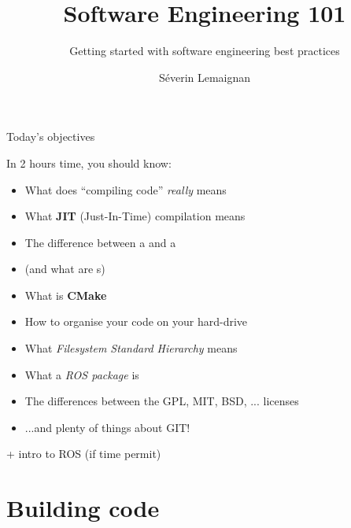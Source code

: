 \documentclass[compress]{beamer}
\title{Software Engineering 101}
\subtitle{Getting started with software engineering best practices}
\date{}
\author{Séverin Lemaignan}
\institute{Bristol Robotics Lab\\{\bf University of West of England}}
\makeatletter
\let\beamer@writeslidentry@miniframeson=\beamer@writeslidentry
\def\beamer@writeslidentry@miniframesoff{%
  \expandafter\beamer@ifempty\expandafter{\beamer@framestartpage}{}%
  {%
    \clearpage\beamer@notesactions%
  }
}
\newcommand*{\miniframeson}{\let\beamer@writeslidentry=\beamer@writeslidentry@miniframeson}
\newcommand*{\miniframesoff}{\let\beamer@writeslidentry=\beamer@writeslidentry@miniframesoff}
\makeatother
\begin{document}

\maketitle

\miniframesoff

\begin{frame}{Today's objectives}

    In 2 hours time, you should know:

    \begin{itemize}
        \item What does ``compiling code'' \emph{really} means
        \item What \textbf{JIT} (Just-In-Time) compilation means
        \item The difference between a  and a 
        \item (and what are s)
        \item What is {\bf CMake}
        \item How to organise your code on your hard-drive
        \item What \emph{Filesystem Standard Hierarchy} means
        \item What a \emph{ROS package} is
        \item The differences between the GPL, MIT, BSD, ... licenses
        \item ...and plenty of things about GIT!
    \end{itemize}

    + intro to ROS (if time permit)
\end{frame}

\miniframeson

\section[Compilation]{Building code}
\end{document}
